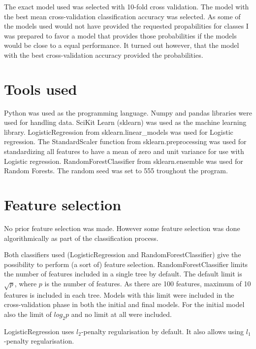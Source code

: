 \documentclass[a4size, 12pt]{report}
\begin{document}
	The exact model used was selected with 10-fold cross validation. The model with the best mean cross-validation classification accuracy was selected. As some of the models used would not have provided the requested propabilities for classes I was prepared to favor a model that provides those probabilities if the models would be close to a equal performance. It turned out however, that the model with the best cross-validation accuracy provided the probabilities.  
		
	
		\section*{Tools used}
	
	Python was used as the programming language. Numpy and pandas libraries were used for handling data. SciKit Learn (sklearn) was used as the machine learning library. 
	LogisticRegression from sklearn.linear\_models was used for Logistic regression. The StandardScaler function from sklearn.preprocessing was used for standardizing all features to have a mean of zero and unit variance for use with Logistic regression. RandomForestClassifier from sklearn.ensemble was used for Random Forests. The random seed was set to 555 troughout the program. 
	
	\section*{Feature selection}
	
   No prior feature selection was made. However some feature selection was done algorithmically as part of the classification process. 	
	
	Both classifiers used (LogisticRegression and RandomForestClassifier) give the possibility to perform (a sort of) feature selection. RandomForestClassifier limits the number of features included in a single tree by default. The default limit is $\sqrt{p}$, where $p$ is the number of features. As there are 100 features, maximum of 10 features is included in each tree. Models with this limit were included  in the cross-validation phase in both the initial and final models. For the initial model also the limit of $log_2 p$ and no limit at all were included. 
	
	 LogisticRegression uses $l_2$-penalty regularisation by default. It also allows using $l_1$-penalty regularisation.
	 
\end{document}
